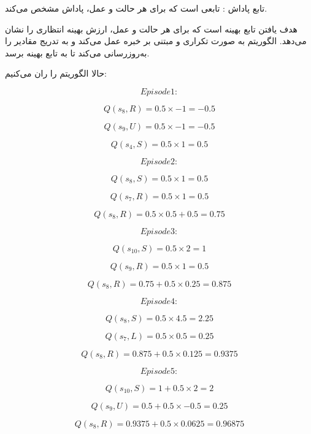 تابع پاداش 
:
تابعی است که برای هر حالت و عمل، پاداش مشخص می‌کند.

هدف
یافتن تابع
بهینه است که برای هر حالت و عمل، ارزش بهینه انتظاری را نشان می‌دهد. الگوریتم
به صورت تکراری و مبتنی بر خبره
عمل می‌کند و به تدریج مقادیر
را به‌روزرسانی می‌کند تا به تابع
بهینه برسد.

حالا الگوریتم را ران می‌کنیم:


$$
Episode 1:
$$

$$
Q(s_8 , R) = 0.5 \times -1 = -0.5
$$

$$
Q(s_9 , U) = 0.5 \times -1 = -0.5
$$

$$
Q(s_4 , S) = 0.5 \times 1 = 0.5
$$

$$
Episode 2:
$$

$$
Q(s_8 , S) = 0.5 \times 1 = 0.5
$$

$$
Q(s_7 , R) = 0.5 \times 1 = 0.5
$$

$$
Q(s_8 , R) = 0.5 \times 0.5 + 0.5 = 0.75
$$

$$
Episode 3:
$$

$$
Q(s_{10} , S) = 0.5 \times 2 = 1
$$

$$
Q(s_9 , R) = 0.5 \times 1 = 0.5
$$

$$
Q(s_8 , R) = 0.75 + 0.5 \times 0.25 = 0.875
$$

$$
Episode 4:
$$

$$
Q(s_8 , S) = 0.5 \times 4.5 = 2.25
$$

$$
Q(s_7 , L) = 0.5 \times 0.5 = 0.25
$$

$$
Q(s_8 , R) = 0.875 + 0.5 \times 0.125 = 0.9375
$$

$$
Episode 5:
$$

$$
Q(s_{10} , S) = 1 + 0.5 \times 2 = 2
$$

$$
Q(s_9 , U) = 0.5 + 0.5 \times -0.5 = 0.25
$$

$$
Q(s_8 , R) = 0.9375 + 0.5 \times 0.0625 = 0.96875
$$